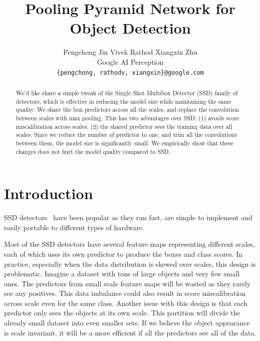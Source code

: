\documentclass[10pt,twocolumn,letterpaper]{article}
\begin{document}
\title{Pooling Pyramid Network for Object Detection}

\author{
Pengchong Jin
\hspace*{32pt}
Vivek Rathod
\hspace*{32pt}
Xiangxin Zhu
\\
Google AI Perception\\
{\tt\small \{pengchong, rathodv, xiangxin\}@google.com}
}


\maketitle

\begin{abstract}
  We'd like share a simple tweak of the Single Shot Multibox Detector
  (SSD) family of detectors,
  which is effective in reducing the model size while
  maintaining the same quality. We share the box predictors
  across all the scales, and replace the convolution between
  scales with max pooling. This has two advantages over
  SSD: (1) avoids score miscalibration across scales; (2)
  the shared predictor sees the training data over all
  scales. Since we reduce the number of predictor to one, and
  trim all the convolutions between them, the model size is
  significantly small. We empirically show that these changes
  does not hurt the model quality compared to SSD.

\end{abstract}

\section{Introduction}
SSD detectors~\cite{liu2016ssd,lin2017focal} have
been popular as they run fast, are simple to implement
and easily portable to different types of hardware.


Most of the SSD detectors have several feature maps
representing different scales, each of which uses its own
predictor to produce the boxes and class scores.
In practice, especially when the data distribution is skewed
over scales, this design is problematic. Imagine a
dataset with tons of large objects and very few small ones.
The predictors from small scale feature maps will be
wasted as they rarely see any positives. This data imbalance
could also result in score miscalibration across scale even
for the same class. Another issue with this design is that
each predictor only sees the objects at its own scale. This
partition will divide the already small dataset
into even smaller sets. If we believe the object
appearance is scale invariant, it will be a more efficient
if all the predictors see all of the data.
\end{document}

